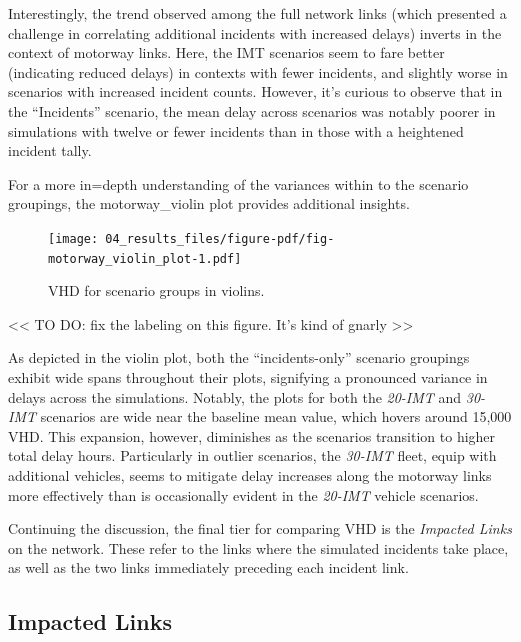 \documentclass[fancy, oneside, mastersfancy, ms]{byuthesis}
\begin{document}
Interestingly, the trend observed among the full network links (which
presented a challenge in correlating additional incidents with increased
delays) inverts in the context of motorway links. Here, the IMT
scenarios seem to fare better (indicating reduced delays) in contexts
with fewer incidents, and slightly worse in scenarios with increased
incident counts. However, it's curious to observe that in the
``Incidents'' scenario, the mean delay across scenarios was notably
poorer in simulations with twelve or fewer incidents than in those with
a heightened incident tally.

For a more in=depth understanding of the variances within to the
scenario groupings, the motorway\_violin plot provides additional
insights.

\begin{figure}

{\centering \texttt{[image: 04\_results\_files/figure-pdf/fig-motorway\_violin\_plot-1.pdf]}

}

\caption{\label{fig-motorway_violin_plot}VHD for scenario groups in
violins.}

\end{figure}

\textless\textless{} TO DO: fix the labeling on this figure. It's kind
of gnarly \textgreater\textgreater{}

As depicted in the violin plot, both the ``incidents-only'' scenario
groupings exhibit wide spans throughout their plots, signifying a
pronounced variance in delays across the simulations. Notably, the plots
for both the \emph{20-IMT} and \emph{30-IMT} scenarios are wide near the
baseline mean value, which hovers around 15,000 VHD. This expansion,
however, diminishes as the scenarios transition to higher total delay
hours. Particularly in outlier scenarios, the \emph{30-IMT} fleet, equip
with additional vehicles, seems to mitigate delay increases along the
motorway links more effectively than is occasionally evident in the
\emph{20-IMT} vehicle scenarios.

Continuing the discussion, the final tier for comparing VHD is the
\emph{Impacted Links} on the network. These refer to the links where the
simulated incidents take place, as well as the two links immediately
preceding each incident link.

\hypertarget{impacted-links}{%
\subsection{Impacted Links}\label{impacted-links}}
\end{document}
